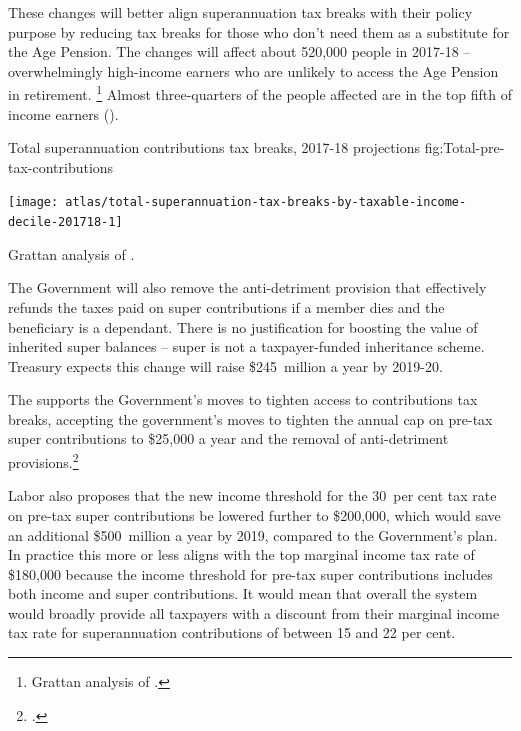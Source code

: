 \documentclass[continuous]{grattan}\usepackage[]{graphicx}\usepackage[]{color}
\newenvironment{knitrout}{}{} %
\begin{document}
These changes will better align superannuation tax breaks with their policy purpose by reducing tax breaks for those who don’t need them as a substitute for the Age Pension. 
The changes will affect about 520,000 people in 2017-18 -- overwhelmingly high-income earners who are unlikely to access the Age Pension in retirement.%
\footnote{Grattan analysis of \textcite{ATO2016SampleFile1314}.} 
Almost three-quarters of the people affected are in the top fifth of income earners ().

\begin{figureTop}
%
{Total superannuation contributions tax breaks, 2017-18 projections}%
{fig:Total-pre-tax-contributions}


\begin{knitrout}
\color{fgcolor}
\texttt{[image: atlas/total-superannuation-tax-breaks-by-taxable-income-decile-201718-1]} 

\end{knitrout}
%
{Grattan analysis of \textcite{ATO2016SampleFile1314}.}
\par\null
\vfill
\null
\end{figureTop}


The Government will also remove the anti-detriment provision that effectively refunds the taxes paid on super contributions if a member dies and the beneficiary is a dependant. 
There is no justification for boosting the value of inherited super balances -- super is not a taxpayer-funded inheritance scheme. 
Treasury expects this change will raise \$245~million a year by 2019-20.

The \ALP{} supports the Government’s moves to tighten access to contributions tax breaks, accepting the government’s moves to tighten the annual cap on pre-tax super contributions to \$25,000 a year and the removal of anti-detriment provisions.\footcites{Bowen-2016-Labors-plan-for-super-not-retrospective}{DaleyCoates-2016-theConvo-A-super-test-for-Aus-pol-system} %

Labor also proposes that the new income threshold for the 30~per cent tax rate on pre-tax super contributions be lowered further to \$200,000, which would save an additional \$500~million a year by 2019, compared to the Government’s plan. 
In practice this more or less aligns with the top marginal income tax rate of \$180,000 because the income threshold for pre-tax super contributions includes both income and super contributions. 
It would mean that overall the system would broadly provide all taxpayers with a discount from their marginal income tax rate for superannuation contributions of between 15 and 22 per cent. 
\end{document}
